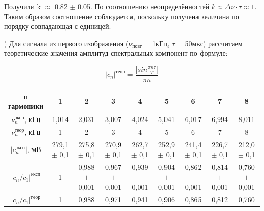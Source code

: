 \documentclass[a4paper,12pt]{article}
\begin{document}

Получили k $\approx$ 0.82 $\pm$ 0.05. По соотношению неопределённостей $k\approx\Delta\nu\cdot\tau\approx1$. Таким образом соотношение соблюдается, поскольку получена величина по порядку совпадающая с единицей.

) Для сигнала из первого изображения ($\nu_{\text{повт}}$ = 1кГц, $\tau$ = 50мкс) рассчитаем теоретические значения амплитуд спектральных компонент по формуле:

$$ {|c_n|}^{теор} = \frac{|sin\frac{\pi n\tau}{T}|}{\pi n} $$

\begin{center}
\begin{tabular}{|c|c|c|c|c|c|c|c|c|}
	\hline
	n гармоники & 1 & 2 & 3 & 4 & 5 & 6 & 7 & 8 \\
	\hline
	$\nu_n^{\text{эксп}}$, кГц & 1,014 & 2,031 & 3,007 & 4,024 & 5,041 & 6,017 & 6,994 & 8,011 \\
	\hline
	$\nu_n^{\text{теор}}$, кГц & 1 & 2 & 3 & 4 & 5 & 6 & 7 & 8 \\
	\hline
	$|c_n^{\text{эксп}}|$, мВ & 279,1 $\pm$ 0,1 & 275,8 $\pm$ 0,1 & 270,9 $\pm$ 0,1 & 262,7 $\pm$ 0,1 & 252,9 $\pm$ 0,1 & 241,4 $\pm$ 0,1 & 226,7 $\pm$ 0,1 & 212,0 $\pm$ 0,1 \\
	\hline
	${|c_n/c_1|}^{\text{эксп}}$ & 1 & 0,988 $\pm$ 0,001 & 0,967 $\pm$ 0,001 & 0,939 $\pm$ 0,001 & 0,904 $\pm$ 0,001 & 0,862 $\pm$ 0,001 & 0,814 $\pm$ 0,001 & 0,760 $\pm$ 0,001 \\
	\hline
	${|{c_n/c_1}|}^{\text{теор}}$ & 1 & 0,988 & 0,971 & 0,941 & 0,906 & 0,865 & 0,812 & 0,760 \\
	\hline
\end{tabular}
\end{center}
\end{document}
